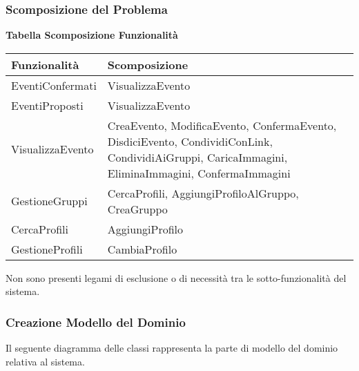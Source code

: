 \subsubsection{Scomposizione del Problema}
\hfill \break

\textbf{Tabella Scomposizione Funzionalità}
\hfill \break

\begin{tabular} {|P{7.3cm}|P{8cm}|}
    \hline
    \textbf{Funzionalità} & \textbf{Scomposizione}                                                                                                                            \\
    \hline
    EventiConfermati      & VisualizzaEvento                                                                                                                                  \\
    \hline
    EventiProposti        & VisualizzaEvento                                                                                                                                  \\
    \hline
    VisualizzaEvento      & CreaEvento, ModificaEvento, ConfermaEvento, DisdiciEvento, CondividiConLink, CondividiAiGruppi, CaricaImmagini, EliminaImmagini, ConfermaImmagini \\
    \hline
    GestioneGruppi        & CercaProfili, AggiungiProfiloAlGruppo, CreaGruppo                                                                                                 \\
    \hline
    CercaProfili          & AggiungiProfilo                                                                                                                                   \\
    \hline
    GestioneProfili       & CambiaProfilo                                                                                                                                     \\
    \hline
\end{tabular}
\hfill \break

Non sono presenti legami di esclusione o di necessità tra le sotto-funzionalità del sistema.

\newpage
\subsubsection{Creazione Modello del Dominio}

Il seguente diagramma delle classi rappresenta la parte di modello del dominio relativa al sistema. \\

